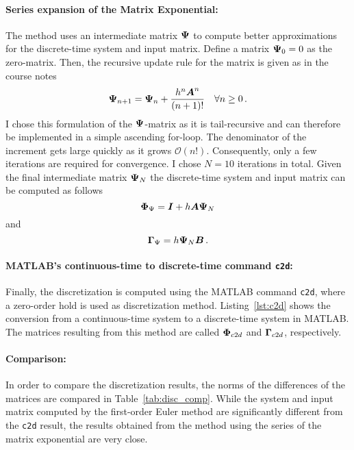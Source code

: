 \paragraph{Series expansion of the Matrix Exponential: } The method uses an intermediate matrix $\boldsymbol{\Psi}$ to compute better approximations for the discrete-time system and input matrix.
Define a matrix $\boldsymbol{\Psi}_0 = 0$ as the zero-matrix.
Then, the recursive update rule for the matrix is given as in the course notes
\begin{equation}
	\boldsymbol{\Psi}_{n+1} = \boldsymbol{\Psi}_n + \frac{h^n \boldsymbol{A}^n}{(n+1)!} \quad \forall n\ge0\, .
\end{equation}
I chose this formulation of the $\boldsymbol{\Psi}$-matrix as it is tail-recursive and can therefore be implemented in a simple ascending for-loop.
The denominator of the increment gets large quickly as it grows $\mathcal{O}(n!)$.
Consequently, only a few iterations are required for convergence. 
I chose $N=10$ iterations in total.
Given the final intermediate matrix $\boldsymbol{\Psi}_N$ the discrete-time system and input matrix can be computed as follows
\begin{equation}
	\boldsymbol{\Phi}_{\Psi} = \boldsymbol{I} + h\boldsymbol{A}\boldsymbol{\Psi}_N	
\end{equation}
and
\begin{equation}
	\boldsymbol{\Gamma}_{\Psi} = h\boldsymbol{\Psi}_N \boldsymbol{B}\, .
\end{equation}

\paragraph{MATLAB's continuous-time to discrete-time command \texttt{c2d}: } Finally, the discretization is computed using the MATLAB command \texttt{c2d}, where a zero-order hold is used as discretization method.
Listing~\ref{lst:c2d} shows the conversion from a continuous-time system to a discrete-time system in MATLAB.
The matrices resulting from this method are called $\boldsymbol{\Phi}_{c2d}$ and $\boldsymbol{\Gamma}_{c2d}$, respectively.

\paragraph{Comparison: } In order to compare the discretization results, the norms of the differences of the matrices are compared in Table~\ref{tab:disc_comp}.
While the system and input matrix computed by the first-order Euler method are significantly different from the \texttt{c2d} result, the results obtained from the method using the series of the matrix exponential are very close.

